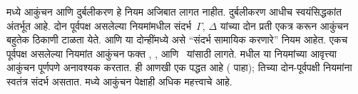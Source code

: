 \documentclass[../../../include/open-logic-section]{subfiles}
\begin{document}
 मध्ये आकुंचन आणि दुर्बलीकरण
हे नियम अजिबात लागत नाहीत. दुर्बलीकरण आधीच
स्वयंसिद्धकांत अंतर्भूत आहे. दोन पूर्वपक्ष असलेल्या
नियमांमधील संदर्भ~$\Gamma$, $\Delta$ यांच्या दोन
प्रती एकत्र करून आकुंचन बहुतेक ठिकाणी टाळता येते.
 आणि  या दोन्हींमध्ये असे
``संदर्भ सामायिक करणारे'' नियम आहेत. एकच पूर्वपक्ष
असलेल्या नियमांत आकुंचन फक्त \RightR{\lor},
\LeftR{\land}, \RightR{\lexists} आणि~\LeftR{\lforall}
यांसाठी लागते.  मधील या नियमांच्या
आवृत्त्या आकुंचन पूर्णपणे अनावश्यक करतात.
 ही आणखी एक पद्धत आहे (
 पाहा); तिच्या दोन-पूर्वपक्षी नियमांना
स्वतंत्र संदर्भ असतात.  मध्ये आकुंचन
 पेक्षाही अधिक महत्त्वाचे आहे.


\end{document}
